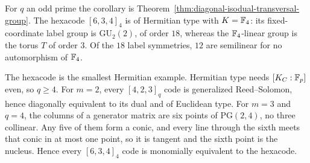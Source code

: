 For \(q\) an odd prime the corollary is
Theorem~\ref{thm:diagonal-isodual-transversal-group}.  The
hexacode \([6,3,4]_4\) is of Hermitian type with \(K=\mathbb F_4\): its
fixed-coordinate label group is \(\mathrm{GU}_2(2)\), of order \(18\), whereas
the \(\mathbb F_4\)-linear group is the torus \(T\) of order \(3\).  Of the \(18\)
label symmetries, \(12\) are semilinear for no automorphism of \(\mathbb F_4\).

The hexacode is the smallest Hermitian example.  Hermitian type needs
\([K_C:\mathbb F_p]\) even, so \(q\geq4\).  For \(m=2\), every \([4,2,3]_q\) code is
generalized Reed--Solomon, hence diagonally equivalent to its dual and of
Euclidean type.  For \(m=3\) and \(q=4\), the columns of a generator matrix
are six points of \(\mathrm{PG}(2,4)\), no three collinear.  Any five of
them form a conic, and every line through the sixth meets that conic in at
most one point, so it is tangent and the sixth point is the nucleus.  Hence
every \([6,3,4]_4\) code is monomially equivalent to the hexacode.
